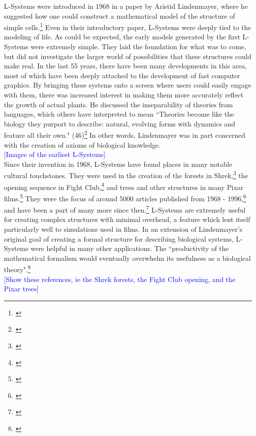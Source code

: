 \documentclass[12pt,twoside]{reedthesis}
\begin{document}
	L-Systems were introduced in 1968 in a paper by Aristid Lindenmayer, where he suggested how one could construct a mathematical model of the structure of simple cells.\footnote{\cite{OG1967}} Even in their introductory paper, L-Systems were deeply tied to the modeling of life. As could be expected, the early models generated by the first L-Systems were extremely simple. They laid the foundation for what was to come, but did not investigate the larger world of possibilities that these structures could make real. In the last 55 years, there have been many developments in this area, most of which have been deeply attached to the development of fast computer graphics. By bringing these systems onto a screen where users could easily engage with them, there was increased interest in making them more accurately reflect the growth of actual plants. He discussed the inseparability of theories from languages, which others have interpreted to mean ``Theories become like the biology they purport to describe: natural, evolving forms with dynamics and feature all their own." (46)\footnote{\cite{theory2004}} In other words, Lindenmayer was in part concerned with the creation of axioms of biological knowledge.\\
	
	\textcolor{blue}{[Images of the earliest L-Systems]}\\
	
	Since their invention in 1968, L-Systems have found places in many notable cultural touchstones. They were used in the creation of the forests in Shrek,\footnote{\cite{shrek2001}} the opening sequence in Fight Club,\footnote{\cite{FightClub1999}} and trees and other structures in many Pixar films.\footnote{\cite{theory2004}} They were the focus of around 5000 articles published from 1968 - 1996,\footnote{\cite{theory2004}} and have been a part of many more since then.\footnote{\cite{manyPapers}} L-Systems are extremely useful for creating complex structures with minimal overhead, a feature which lent itself particularly well to simulations used in films. In an extension of Lindenmayer's original goal of creating a formal structure for describing biological systems, L-Systems were helpful in many other applications. The ``productivity of the mathematical formalism would eventually overwhelm its usefulness as a biological theory".\footnote{\cite{theory2004}}\\
	
	\textcolor{blue}{[Show these references, ie the Shrek forests, the Fight Club opening, and the Pixar trees]}\\
	
\end{document}

